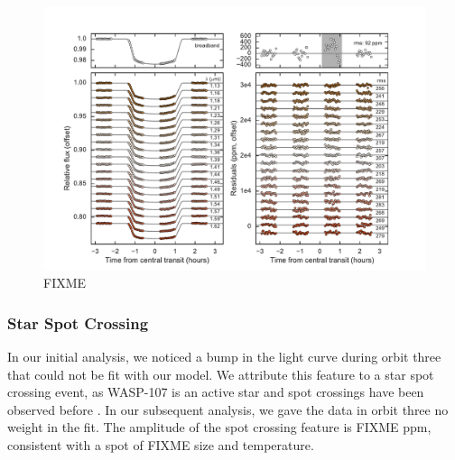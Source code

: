 \documentclass[twocolumn]{aastex61}
\begin{document}
\begin{figure}
\includegraphics[width = \textwidth]{Figures/lc.pdf}
\caption{FIXME}
\label{fig:lc}
\end{figure}

\subsubsection{Star Spot Crossing}
In our initial analysis, we noticed a bump in the light curve during orbit three that could not be fit with our model. We attribute this feature to a star spot crossing event, as WASP-107 is an active star and spot crossings have been observed before \citep{dai17, mocnik17}. In our subsequent analysis, we gave the data in orbit three no weight in the fit. The amplitude of the spot crossing feature is FIXME ppm, consistent with a spot of FIXME size and temperature.

\end{document}
